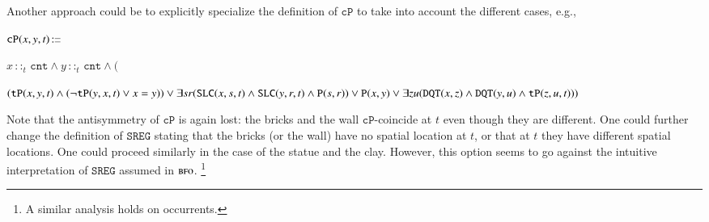 \documentclass[ao]{iosart2x}
\newcommand{\nb}[1]{\textcolor{red}{$|$}\marginpar{\hspace*{-0cm}\parbox{20mm}{\scriptsize\raggedright\textcolor{red}{#1}}}}
\newcommand{\bflist}{\begin{list}{}{\setlength{\topsep}{2mm}\setlength{\parsep}{0mm}\setlength{\leftmargin}{9.2mm}\setlength{\labelwidth}{8mm}}}
\newcommand{\eflist}{\end{list}}
\newcommand{\dbThrLabel}{\textrm{t$_\texttt{db}$}}
\newcommand{\refdbth}[1]{({\dbThrLabel}\ref{#1})}
\newcommand{\pr}[1]{\mathtt{#1}}
\newcommand{\cn}[1]{\mathtt{#1}}
\newcommand\textequal{%
 \rule[.08ex]{5pt}{0.35pt}\llap{\rule[.78ex]{5pt}{0.35pt}}}
\newcommand{\sdef}{{\hspace{1.5pt}:\hspace{-2.5pt}\textequal\hspace{3pt}}}
\newcommand{\bfo}{{\textsc{bfo}}}
\newcommand {\TPd} {\ensuremath{\pr{tP}}}
\newcommand {\Pd} {\ensuremath{\pr{P}}}
\newcommand {\DQTd} {\ensuremath{\pr{DQT}}}
\newcommand {\SLCd} {\ensuremath{\pr{SLC}}}
\newcommand{\cntbcat}{\cn{cnt}}
\newcommand{\bfocpart}{\pr{cP}}
\newcommand{\bfoiof}[1]{{\,::_{#1\:\!}}}
\newcommand{\bfosregof}{\pr{SREG}}
\begin{document}
Another approach could be to explicitly specialize the definition of $\bfocpart$ to take into account the different cases, e.g.,  
\bflist
\item[] $\bfocpart(x,y,t) \sdef $\parbox[t]{\textwidth} {$x \bfoiof{t} \cntbcat \land y \bfoiof{t} \cntbcat \land 
($\parbox[t]{\textwidth} {$(\TPd(x,y,t) \land (\neg \TPd(y,x,t) \lor x=y)) \lor \\ 
\exists sr(\SLCd(x,s,t) \land \SLCd(y,r,t) \land \Pd(s,r)) \lor \\ 
\Pd(x,y) \lor \exists zu(\DQTd(x,z) \land \DQTd(y,u) \land \TPd(z,u,t)))$}}
\eflist
Note that the antisymmetry of $\bfocpart$ is again lost: the bricks and the wall $\bfocpart$-coincide at $t$ even though they are different. One could further change the definition of $\bfosregof$ stating that the bricks (or the wall) have no spatial location at $t$, or that at $t$ they have different spatial locations. One could proceed similarly in the case of the statue and the clay. However, this option seems to go against the intuitive interpretation of $\bfosregof$ assumed in $\bfo$.%
\footnote{A similar analysis holds on occurrents.}%
\end{document}
